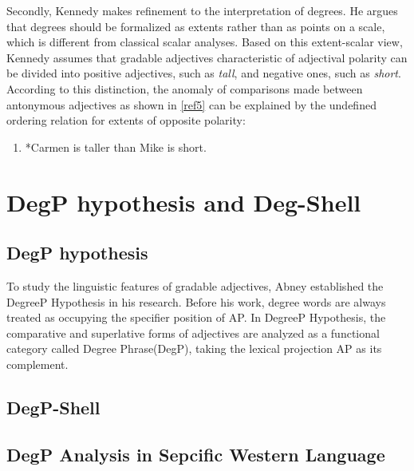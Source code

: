 \documentclass{ctexart}
\let \cite \parencite
\begin{document}
Secondly, Kennedy makes refinement to the interpretation of degrees. He argues that degrees should be formalized as extents\cite{seuren1978,von1984b,bierwisch1989,lobner2010} rather than as points on a scale, which is different from classical scalar analyses. Based on this extent-scalar view, Kennedy assumes that gradable adjectives characteristic of adjectival polarity can be divided into positive adjectives, such as \textit{tall}, and negative ones, such as \textit{short}. According to this distinction, the anomaly of comparisons made between antonymous adjectives as shown in \ref{ref5} can be explained by the undefined ordering relation for extents of opposite polarity:

\begin{enumerate}[resume]
\item \label{ref5}
*Carmen is taller than Mike is short.
\end{enumerate}



\section{DegP hypothesis and Deg-Shell}

\subsection{DegP hypothesis}

To study the linguistic features of gradable adjectives, Abney established the DegreeP Hypothesis in his research\cite{abney1987}. Before his work, degree words are always treated as occupying the specifier position of AP\cite{bowers1975,jackendoff1977}. In DegreeP Hypothesis, the comparative and superlative forms of adjectives are analyzed as a functional category called Degree Phrase(DegP), taking the lexical projection AP as its complement.

\subsection{DegP-Shell}

\subsection{DegP Analysis in Sepcific Western Language}
\end{document}
